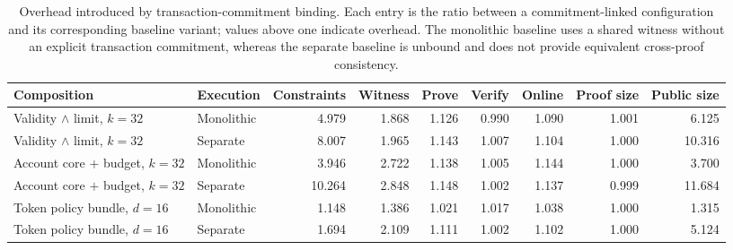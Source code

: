 \begin{table}[t]
\centering
\scriptsize
\setlength{\tabcolsep}{3.2pt}
\renewcommand{\arraystretch}{1.05}
\caption{Overhead introduced by transaction-commitment binding. Each entry is
the ratio between a commitment-linked configuration and its corresponding
baseline variant; values above one indicate overhead. The monolithic baseline
uses a shared witness without an explicit transaction commitment, whereas the
separate baseline is unbound and does not provide equivalent cross-proof
consistency.}
\label{tab:binding-overhead}
\begin{tabular}{@{}llrrrrrrr@{}}
\toprule
\textbf{Composition} &
\textbf{Execution} &
\textbf{Constraints} &
\textbf{Witness} &
\textbf{Prove} &
\textbf{Verify} &
\textbf{Online} &
\textbf{Proof size} &
\textbf{Public size} \\
\midrule
Validity $\wedge$ limit, $k=32$ & Monolithic & 4.979 & 1.868 & 1.126 & 0.990 & 1.090 & 1.001 & 6.125 \\
Validity $\wedge$ limit, $k=32$ & Separate & 8.007 & 1.965 & 1.143 & 1.007 & 1.104 & 1.000 & 10.316 \\
\addlinespace[1pt]
Account core $+$ budget, $k=32$ & Monolithic & 3.946 & 2.722 & 1.138 & 1.005 & 1.144 & 1.000 & 3.700 \\
Account core $+$ budget, $k=32$ & Separate & 10.264 & 2.848 & 1.148 & 1.002 & 1.137 & 0.999 & 11.684 \\
\addlinespace[1pt]
Token policy bundle, $d=16$ & Monolithic & 1.148 & 1.386 & 1.021 & 1.017 & 1.038 & 1.000 & 1.315 \\
Token policy bundle, $d=16$ & Separate & 1.694 & 2.109 & 1.111 & 1.002 & 1.102 & 1.000 & 5.124 \\
\bottomrule
\end{tabular}
\end{table}
